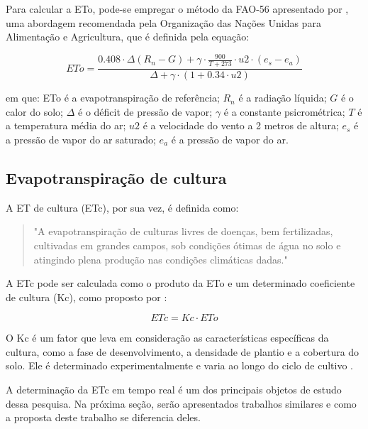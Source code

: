 Para calcular a ETo, pode-se empregar o método da FAO-56 apresentado por \textcite{Allen_evapotranspiration1998}, uma abordagem recomendada pela Organização das Nações Unidas para Alimentação e Agricultura, que é definida pela equação:

\begin{equation}
ETo = \frac{0.408 \cdot \Delta (R_n - G) + \gamma \cdot \frac{900}{T + 273} \cdot u2 \cdot (e_s - e_a)}{\Delta + \gamma \cdot (1 + 0.34 \cdot u2)}
\end{equation}

\noindent em que: ETo é a evapotranspiração de referência; $R_n$ é a radiação líquida; $G$ é o calor do solo; $\Delta$ é o déficit de pressão de vapor; $\gamma$ é a constante psicrométrica; $T$ é a temperatura média do ar; $u2$ é a velocidade do vento a 2 metros de altura; $e_s$ é a pressão de vapor do ar saturado; $e_a$ é a pressão de vapor do ar.

\subsection{Evapotranspiração de cultura}

A ET de cultura (ETc), por sua vez, é definida como:

\begin{quote}
  "A evapotranspiração de culturas livres de doenças, bem fertilizadas, cultivadas em grandes campos, sob condições ótimas de água no solo e atingindo plena produção nas condições climáticas dadas." \parencite[{p. 7}]{Allen_evapotranspiration1998}
\end{quote}

A ETc pode ser calculada como o produto da ETo e um determinado coeficiente de cultura (Kc), como proposto por \textcite{Allen_evapotranspiration1998}:

\begin{equation}
ETc = Kc \cdot ETo
\end{equation}

O Kc é um fator que leva em consideração as características específicas da cultura, como a fase de desenvolvimento, a densidade de plantio e a cobertura do solo. Ele é determinado experimentalmente e varia ao longo do ciclo de cultivo \parencite{bernardo_irrigacao2008}.

A determinação da ETc em tempo real é um dos principais objetos de estudo dessa pesquisa. Na próxima seção, serão apresentados trabalhos similares e como a proposta deste trabalho se diferencia deles.

